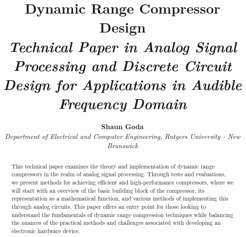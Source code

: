 \documentclass[10pt]{article}
\begin{document}
    \pagestyle{fancy}
    \fancyhf{}
    \renewcommand{\headrulewidth}{0pt}
    \fancypagestyle{firstpage}{
        \fancyhf{}
        \fancyfoot[C]{\footnotesize Page \thepage\ of \pageref{LastPage}}
        \renewcommand{\headrulewidth}{0pt}
    }

    \title{
        \vspace{-5ex}
        \textbf{\huge Dynamic Range Compressor Design}\\
        \textit{Technical Paper in Analog Signal Processing and Discrete Circuit Design for Applications in Audible Frequency Domain}
    }

    \author{
        \textbf{\Large Shaun Goda}\\
        \textit{\normalsize Department of Electrical and Computer Engineering, Rutgers University - New Brunswick}
    }

    \date{\vspace{-5ex}} %

    \maketitle

    \thispagestyle{firstpage}

    \begin{abstract}
        This technical paper examines the theory and implementation of dynamic range compressors in the realm of analog signal processing. Through tests and evaluations, we present methods for achieving efficient and high-performance compressors, where we will start with an overview of the basic building block of the compressor, its representation as a mathematical function, and various methods of implementing this through analog circuits. This paper offers an entry point for those looking to understand the fundamentals of dynamic range compression techniques while balancing the nuances of the practical methods and challenges associated with developing an electronic hardware device.
    \end{abstract}
    
\end{document}
